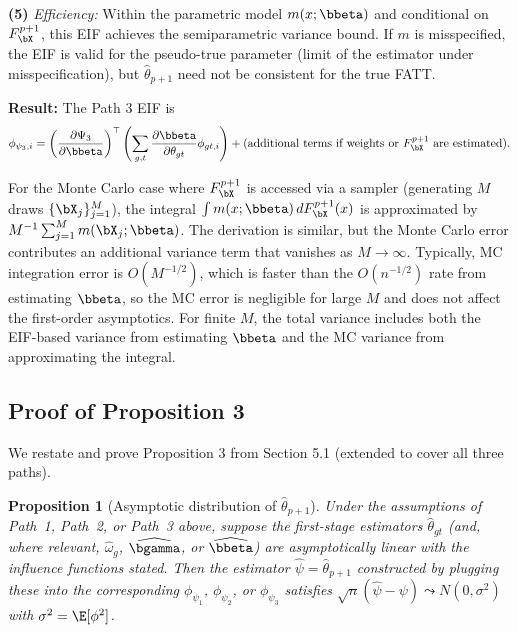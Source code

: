 \documentclass{article}
\newtheorem*{proposition*}{Proposition}
\begin{document}
\textbf{(5)} \textit{Efficiency:} Within the parametric model $m(x;\bbeta)$ and conditional on $F_{\bX}^{p+1}$, this EIF achieves the semiparametric variance bound. If $m$ is misspecified, the EIF is valid for the pseudo-true parameter (limit of the estimator under misspecification), but $\widehat{\theta}_{p+1}$ need not be consistent for the true FATT.

\textbf{Result:} The Path 3 EIF is
\[
\phi_{\psi_3,i} = \left(\frac{\partial \Psi_3}{\partial \bbeta}\right)^\top \left(\sum_{g,t} \frac{\partial \bbeta}{\partial \theta_{gt}} \phi_{gt,i}\right) + \text{(additional terms if weights or } F_{\bX}^{p+1} \text{ are estimated)}.
\]

\begin{remark}
For the Monte Carlo case where $F_{\bX}^{p+1}$ is accessed via a sampler (generating $M$ draws $\{\bX_j\}_{j=1}^M$), the integral $\int m(x;\bbeta) \, dF_{\bX}^{p+1}(x)$ is approximated by $M^{-1}\sum_{j=1}^M m(\bX_j;\bbeta)$. The derivation is similar, but the Monte Carlo error contributes an additional variance term that vanishes as $M \to \infty$. Typically, MC integration error is $O(M^{-1/2})$, which is faster than the $O(n^{-1/2})$ rate from estimating $\bbeta$, so the MC error is negligible for large $M$ and does not affect the first-order asymptotics. For finite $M$, the total variance includes both the EIF-based variance from estimating $\bbeta$ and the MC variance from approximating the integral.
\end{remark}

\subsection{Proof of Proposition 3}\label{app:prop3}

We restate and prove Proposition 3 from Section 5.1 (extended to cover all three paths).

\begin{proposition*}[Asymptotic distribution of $\widehat{\theta}_{p+1}$]
Under the assumptions of Path~1, Path~2, or Path~3 above, suppose the first-stage estimators $\widehat{\theta}_{gt}$ (and, where relevant, $\widehat{\omega}_g$, $\widehat{\bgamma}$, or $\widehat{\bbeta}$) are asymptotically linear with the influence functions stated. Then the estimator $\widehat{\psi} = \widehat{\theta}_{p+1}$ constructed by plugging these into the corresponding $\phi_{\psi_1}$, $\phi_{\psi_2}$, or $\phi_{\psi_3}$ satisfies $\sqrt{n}(\widehat{\psi} - \psi) \leadsto N(0, \sigma^2)$ with $\sigma^2 = \E[\phi^2]$.
\end{proposition*}
\end{document}
